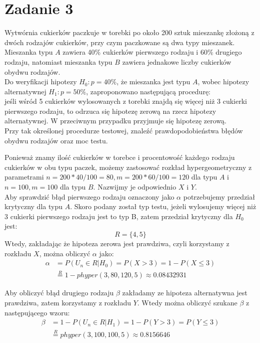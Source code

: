 \documentclass{article}
\begin{document}
\newpage
\section{Zadanie 3}
Wytwórnia cukierków paczkuje w torebki po około 200 sztuk mieszankę złożoną z dwóch rodzajów cukierków, przy czym paczkowane są dwa typy mieszanek. Mieszanka typu $A$ zawiera 40\% cukierków pierwszego rodzaju i 60\% drugiego rodzaju, natomiast mieszanka typu $B$ zawiera jednakowe liczby cukierków obydwu rodzajów. \\
Do weryfikacji hipotezy $H_0:p=40\%$, że mieszanka jest typu $A$, wobec hipotezy alternatywnej $H_1:p=50\%$, zaproponowano następującą procedurę:\\ jeśli wśród 5 cukierków wylosowanych z torebki znajdą się więcej niż 3 cukierki pierwszego rodzaju, to odrzuca się hipotezę zerową na rzecz hipotezy alternatywnej. W przeciwnym przypadku przyjmuje się hipotezę zerową.\\
Przy tak określonej procedurze testowej, znaleźć prawdopodobieństwa błędów obydwu rodzajów oraz moc testu. \\ \par

Ponieważ znamy ilość cukierków w torebce i procentowość każdego rodzaju cukierków w obu typu paczek, możemy zastosować rozkład hypergeometryczny z parametrami $n = 200*40/100 = 80, m = 200*60/100 = 120$ dla typu $A$ i $n = 100, m = 100$ dla typu $B$. Nazwijmy je odpowiednio $X$ i $Y$.\\
Aby sprawdzić błąd pierwszego rodzaju oznaczony jako $\alpha$ potrzebujemy przedział krytyczny dla typu $A$. Skoro podany został typ testu, jeżeli wylosujemy więcej niż 3 cukierki pierwszego rodzaju jest to typ B, zatem przedział krytyczny dla $H_0$ jest:
\[ R = \{4,5\} \]
Wtedy, zakładając że hipoteza zerowa jest prawdziwa, czyli korzystamy z rozkładu $X$, można obliczyć $\alpha$ jako:
\begin{align*}
\alpha & = P(U_n \in R | H_0) = P(X > 3) = 1 - P(X \leq 3) \\
& \overset{R}{=} 1 - phyper(3, 80, 120, 5) \approx 0.08432931
\end{align*}

Aby obliczyć błąd drugiego rodzaju $\beta$ zakładamy ze hipoteza alternatywna jest prawdziwa, zatem korzystamy z rozkładu $Y$.
Wtedy można obliczyć szukane $\beta$ z następującego wzoru:
\begin{align*}
\beta & = 1 - P(U_n \in R | H_1) = 1 - P(Y > 3) = P(Y \leq 3) \\
& \overset{R}{=} phyper(3, 100, 100, 5) \approx 0.8156646
\end{align*}
\end{document}
